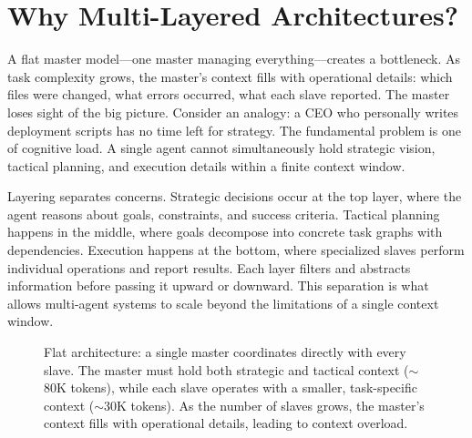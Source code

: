 
\section{Why Multi-Layered Architectures?}\label{sec:why_layers}

A flat master model—one master managing everything—creates a bottleneck. As task complexity grows, the master's context fills with operational details: which files were changed, what errors occurred, what each slave reported. The master loses sight of the big picture. Consider an analogy: a CEO who personally writes deployment scripts has no time left for strategy. The fundamental problem is one of cognitive load. A single agent cannot simultaneously hold strategic vision, tactical planning, and execution details within a finite context window.

Layering separates concerns. Strategic decisions occur at the top layer, where the agent reasons about goals, constraints, and success criteria. Tactical planning happens in the middle, where goals decompose into concrete task graphs with dependencies. Execution happens at the bottom, where specialized slaves perform individual operations and report results. Each layer filters and abstracts information before passing it upward or downward. This separation is what allows multi-agent systems to scale beyond the limitations of a single context window.

\begin{figure}[t]
\centering
{}
\caption{Flat architecture: a single master coordinates directly with every slave. The master must hold both strategic and tactical context ($\sim$80K tokens), while each slave operates with a smaller, task-specific context ($\sim$30K tokens). As the number of slaves grows, the master's context fills with operational details, leading to context overload.}
\label{fig:flat_architecture}
\end{figure}


